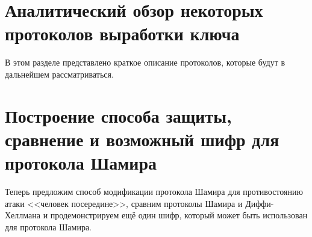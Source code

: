 \section{Аналитический обзор некоторых протоколов выработки ключа}
В этом разделе представлено краткое описание протоколов, которые будут в дальнейшем рассматриваться.

\section{Построение способа защиты, сравнение и возможный шифр для протокола Шамира}
Теперь предложим способ модификации протокола Шамира для противостоянию атаки <<человек посередине>>, сравним  протоколы Шамира и Диффи-Хеллмана и продемонстрируем ещё один шифр, который может быть использован для протокола Шамира.


\printbibliography[%
    heading=bibintoc%
]

\appendix
{}


